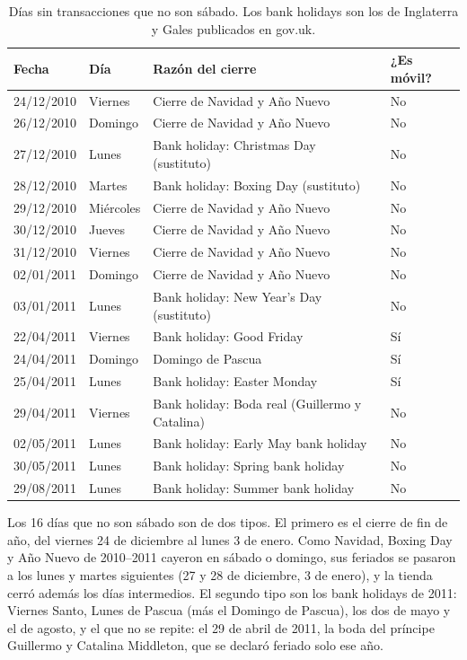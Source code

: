 \documentclass[11pt]{article}
\begin{document}
\begin{table}[H]
\centering
\caption{Días sin transacciones que no son sábado. Los bank holidays son los de Inglaterra y
Gales publicados en gov.uk.}\label{tab:cerrados}
\small
\begin{tabular}{|l|l|l|l|}
\hline
Fecha & Día & Razón del cierre & ¿Es móvil? \\
\hline
24/12/2010 & Viernes & Cierre de Navidad y Año Nuevo & No \\
26/12/2010 & Domingo & Cierre de Navidad y Año Nuevo & No \\
27/12/2010 & Lunes & Bank holiday: Christmas Day (sustituto) & No \\
28/12/2010 & Martes & Bank holiday: Boxing Day (sustituto) & No \\
29/12/2010 & Miércoles & Cierre de Navidad y Año Nuevo & No \\
30/12/2010 & Jueves & Cierre de Navidad y Año Nuevo & No \\
31/12/2010 & Viernes & Cierre de Navidad y Año Nuevo & No \\
02/01/2011 & Domingo & Cierre de Navidad y Año Nuevo & No \\
03/01/2011 & Lunes & Bank holiday: New Year's Day (sustituto) & No \\
22/04/2011 & Viernes & Bank holiday: Good Friday & Sí \\
24/04/2011 & Domingo & Domingo de Pascua & Sí \\
25/04/2011 & Lunes & Bank holiday: Easter Monday & Sí \\
29/04/2011 & Viernes & Bank holiday: Boda real (Guillermo y Catalina) & No \\
02/05/2011 & Lunes & Bank holiday: Early May bank holiday & No \\
30/05/2011 & Lunes & Bank holiday: Spring bank holiday & No \\
29/08/2011 & Lunes & Bank holiday: Summer bank holiday & No \\
\hline
\end{tabular}
\end{table}

Los 16 días que no son sábado son de dos tipos. El primero es el cierre de fin de año, del
viernes 24 de diciembre al lunes 3 de enero. Como Navidad, Boxing Day y Año Nuevo de 2010--2011
cayeron en sábado o domingo, sus feriados se pasaron a los lunes y martes siguientes
(27 y 28 de diciembre, 3 de enero), y la tienda cerró además los días intermedios. El segundo
tipo son los bank holidays de 2011: Viernes Santo, Lunes de Pascua (más el Domingo de Pascua),
los dos de mayo y el de agosto, y el que no se repite: el 29 de abril de 2011, la boda
del príncipe Guillermo y Catalina Middleton, que se declaró feriado solo ese año.
\end{document}
